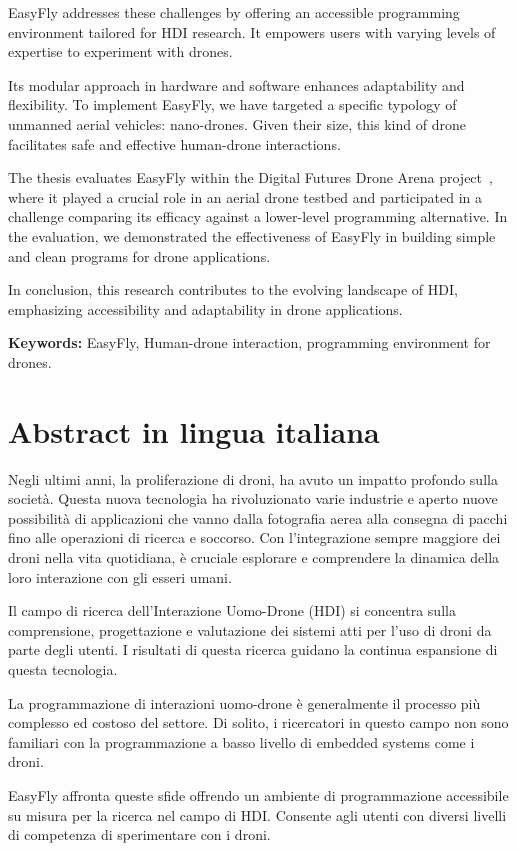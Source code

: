 \documentclass{Configuration_Files/PoliMi3i_thesis}
\begin{document}
EasyFly addresses these challenges by offering an accessible programming environment tailored for HDI research. 
It empowers users with varying levels of expertise to experiment with drones.

Its modular approach in hardware and software enhances adaptability and flexibility.
To implement EasyFly, we have targeted a specific typology of unmanned aerial vehicles: nano-drones.
Given their size, this kind of drone facilitates safe and effective human-drone interactions.

The thesis evaluates EasyFly within the Digital Futures Drone Arena project~\cite{dronearena}, where it played a crucial role in an aerial drone testbed and participated in a challenge comparing its efficacy against a lower-level programming alternative.
In the evaluation, we demonstrated the effectiveness of EasyFly in building simple and clean programs for drone applications.

In conclusion, this research contributes to the evolving landscape of HDI, emphasizing accessibility and adaptability in drone applications.

\textbf{Keywords:} EasyFly, Human-drone interaction, programming environment for drones. %

\chapter*{Abstract in lingua italiana}
Negli ultimi anni, la proliferazione di droni, ha avuto un impatto profondo sulla società. 
Questa nuova tecnologia ha rivoluzionato varie industrie e aperto nuove possibilità di applicazioni che vanno dalla fotografia aerea alla consegna di pacchi fino alle operazioni di ricerca e soccorso. 
Con l'integrazione sempre maggiore dei droni nella vita quotidiana, è cruciale esplorare e comprendere la dinamica della loro interazione con gli esseri umani.

Il campo di ricerca dell'Interazione Uomo-Drone (HDI) si concentra sulla comprensione, progettazione e valutazione dei sistemi atti per l'uso di droni da parte degli utenti. 
I risultati di questa ricerca guidano la continua espansione di questa tecnologia.

La programmazione di interazioni uomo-drone è generalmente il processo più complesso ed costoso del settore. 
Di solito, i ricercatori in questo campo non sono familiari con la programmazione a basso livello di embedded systems come i droni.

EasyFly affronta queste sfide offrendo un ambiente di programmazione accessibile su misura per la ricerca nel campo di HDI. 
Consente agli utenti con diversi livelli di competenza di sperimentare con i droni.
\end{document}
